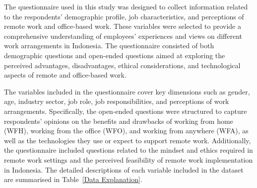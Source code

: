 \documentclass[a4paper, conference]{IEEEtran}
\begin{document}
The questionnaire used in this study was designed to collect information related to the respondents' demographic profile, job characteristics, and perceptions of remote work and office-based work. These variables were selected to provide a comprehensive understanding of employees' experiences and views on different work arrangements in Indonesia. The questionnaire consisted of both demographic questions and open-ended questions aimed at exploring the perceived advantages, disadvantages, ethical considerations, and technological aspects of remote and office-based work.

The variables included in the questionnaire cover key dimensions such as gender, age, industry sector, job role, job responsibilities, and perceptions of work arrangements. Specifically, the open-ended questions were structured to capture respondents' opinions on the benefits and drawbacks of working from home (WFH), working from the office (WFO), and working from anywhere (WFA), as well as the technologies they use or expect to support remote work. Additionally, the questionnaire included questions related to the mindset and ethics required in remote work settings and the perceived feasibility of remote work implementation in Indonesia. The detailed descriptions of each variable included in the dataset are summarised in Table~\ref{Data Explanation}.
\end{document}
